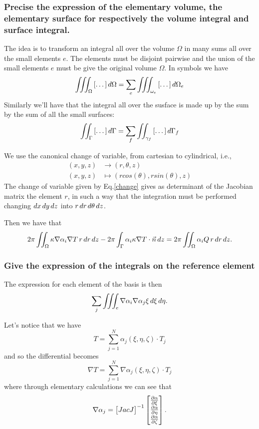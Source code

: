 \subsubsection{Precise the expression of the elementary volume, the elementary surface for respectively the volume integral and surface integral.}
\begin{mdframed}
	The idea is to transform an integral all over the volume $ \Omega $ in many sums all over the small elements $ e $. The elements must be disjoint pairwise and the union of the small elements $ e $ must be give the original volume $ \Omega $. In symbols we have
	\[\iiint_{\Omega}\left[\dots\right]\mathop{}\!d\Omega=\sum_e\iiint_{\omega_e}\left[\dots\right]\mathop{}\!d\Omega_e \]
	Similarly we'll have that the integral all over the susface is made up by the sum by the sum of all the small surfaces:
	\[\iint_{\Gamma}\left[\dots\right]\mathop{}\!d\Gamma=\sum_f\iint_{\gamma_f}\left[\dots\right]\mathop{}\!d\Gamma_f \] 
	
	We use the canonical change of variable, from cartesian to cylindrical, i.e., \begin{align}\label{change}
	(x,y,z)&\to(r,\theta,z)\\
	(x,y,z)&\mapsto(rcos(\theta),rsin(\theta),z)\nonumber
	\end{align}
	The change of variable given by Eq.\ref{change} gives as determinant of the Jacobian matrix the element $ r $, in such a way that the integration must be performed changing $ \mathop{}\!d x\mathop{}\!d y\mathop{}\!d z $ into $ r\mathop{}\!d r\mathop{}\!d\theta\mathop{}\!d z $.
	
	Then we have that 
	\[ 2\pi\iint_{\Omega}\kappa\nabla\alpha_i\nabla T\,r\mathop{}\!d r\mathop{}\!d z-2\pi\int_{\Gamma}\alpha_i\kappa\nabla T\cdot\vec{n}\mathop{}\!d z=2\pi\iint_{\Omega}\alpha_i Q\,r\mathop{}\!d r\mathop{}\!d z. \]
\end{mdframed}
\subsubsection{Give the expression of the integrals on the reference element}
The expression for each element of the basis is then
\[\sum_j \iiint_{e}\nabla\alpha_i\nabla\alpha_j\xi\mathop{}\!d\xi\mathop{}\!d\eta. \] 

Let's notice that we have 
\[T=\sum_{j=1}^N\alpha_j(\xi,\eta,\zeta)\cdot T_j \]
and so the differential becomes
\[\nabla T=\sum_{j=1}^N\nabla\alpha_j(\xi,\eta,\zeta)\cdot T_j \]
where through elementary calculations we can see that 
\[\nabla \alpha_j=\begin{bmatrix} Jac J \end{bmatrix}^{-1}\begin{bmatrix}
\frac{\partial \alpha}{\partial \xi}\\\frac{\partial \alpha}{\partial \eta}\\\frac{\partial \alpha}{\partial \zeta} 
\end{bmatrix}. \]

